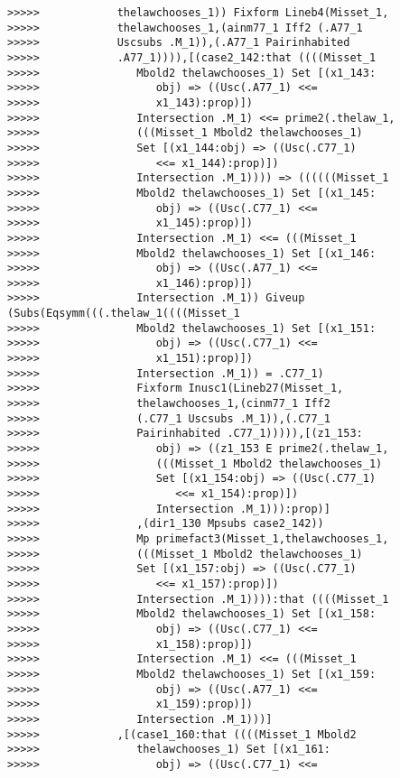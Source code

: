 \documentclass[12pt]{article}
\begin{document}
\begin{verbatim}
>>>>>            thelawchooses_1)) Fixform Lineb4(Misset_1,
>>>>>            thelawchooses_1,(ainm77_1 Iff2 (.A77_1
>>>>>            Uscsubs .M_1)),(.A77_1 Pairinhabited
>>>>>            .A77_1)))),[(case2_142:that ((((Misset_1
>>>>>               Mbold2 thelawchooses_1) Set [(x1_143:
>>>>>                  obj) => ((Usc(.A77_1) <<=
>>>>>                  x1_143):prop)])
>>>>>               Intersection .M_1) <<= prime2(.thelaw_1,
>>>>>               (((Misset_1 Mbold2 thelawchooses_1)
>>>>>               Set [(x1_144:obj) => ((Usc(.C77_1)
>>>>>                  <<= x1_144):prop)])
>>>>>               Intersection .M_1)))) => ((((((Misset_1
>>>>>               Mbold2 thelawchooses_1) Set [(x1_145:
>>>>>                  obj) => ((Usc(.C77_1) <<=
>>>>>                  x1_145):prop)])
>>>>>               Intersection .M_1) <<= (((Misset_1
>>>>>               Mbold2 thelawchooses_1) Set [(x1_146:
>>>>>                  obj) => ((Usc(.A77_1) <<=
>>>>>                  x1_146):prop)])
>>>>>               Intersection .M_1)) Giveup (Subs(Eqsymm(((.thelaw_1((((Misset_1
>>>>>               Mbold2 thelawchooses_1) Set [(x1_151:
>>>>>                  obj) => ((Usc(.C77_1) <<=
>>>>>                  x1_151):prop)])
>>>>>               Intersection .M_1)) = .C77_1)
>>>>>               Fixform Inusc1(Lineb27(Misset_1,
>>>>>               thelawchooses_1,(cinm77_1 Iff2
>>>>>               (.C77_1 Uscsubs .M_1)),(.C77_1
>>>>>               Pairinhabited .C77_1))))),[(z1_153:
>>>>>                  obj) => ((z1_153 E prime2(.thelaw_1,
>>>>>                  (((Misset_1 Mbold2 thelawchooses_1)
>>>>>                  Set [(x1_154:obj) => ((Usc(.C77_1)
>>>>>                     <<= x1_154):prop)])
>>>>>                  Intersection .M_1))):prop)]
>>>>>               ,(dir1_130 Mpsubs case2_142))
>>>>>               Mp primefact3(Misset_1,thelawchooses_1,
>>>>>               (((Misset_1 Mbold2 thelawchooses_1)
>>>>>               Set [(x1_157:obj) => ((Usc(.C77_1)
>>>>>                  <<= x1_157):prop)])
>>>>>               Intersection .M_1)))):that ((((Misset_1
>>>>>               Mbold2 thelawchooses_1) Set [(x1_158:
>>>>>                  obj) => ((Usc(.C77_1) <<=
>>>>>                  x1_158):prop)])
>>>>>               Intersection .M_1) <<= (((Misset_1
>>>>>               Mbold2 thelawchooses_1) Set [(x1_159:
>>>>>                  obj) => ((Usc(.A77_1) <<=
>>>>>                  x1_159):prop)])
>>>>>               Intersection .M_1)))]
>>>>>            ,[(case1_160:that ((((Misset_1 Mbold2
>>>>>               thelawchooses_1) Set [(x1_161:
>>>>>                  obj) => ((Usc(.C77_1) <<=

\end{verbatim}
\end{document}
